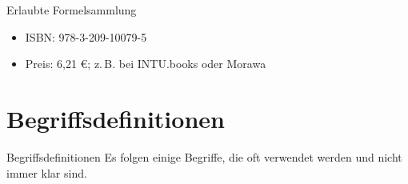 \documentclass{beamer}
\begin{document}
\begin{frame}{Erlaubte Formelsammlung}
    \begin{figure}[htp]
        \centering
        \hfill
    \end{figure}
    \begin{itemize}
        \item ISBN: 978-3-209-10079-5
        \item Preis: 6{,}21 €; z.\,B. bei INTU.books oder Morawa
    \end{itemize}
\end{frame}

\section{Begriffsdefinitionen}

\begin{frame}{Begriffsdefinitionen}
    Es folgen einige Begriffe, die oft verwendet werden und nicht immer klar
    sind.
\end{frame}
\end{document}
